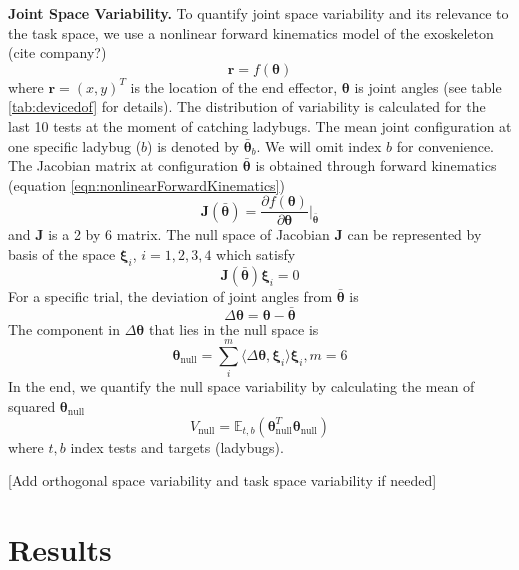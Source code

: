 \textbf{Joint Space Variability.}
To quantify joint space variability and its relevance to the task space, we use a nonlinear forward kinematics model of the exoskeleton (cite company?)
	\begin{equation}\label{eqn:nonlinearForwardKinematics}
	\bm{r} = f(\bm{\theta})
	\end{equation}
where $ \bm{r} = (x,y)^T $ is the location of the end effector, $ \bm{\theta} $ is joint angles (see table \ref{tab:devicedof} for details). 
The distribution of variability is calculated for the last 10 tests at the moment of catching ladybugs. 
The mean joint configuration at one specific ladybug ($ b $) is denoted by $ \bar{\bm{\theta}}_b $.
We will omit index $ b $ for convenience.
The Jacobian matrix at configuration $ \bar{\bm{\theta}} $ is obtained through forward kinematics (equation \ref{eqn:nonlinearForwardKinematics})
	\begin{equation}
	\bm{J}(\bar{\bm{\theta}}) = \frac{\partial f(\bm{\theta})}{\partial \bm{\theta}} \Big\rvert_{\bar{\bm{\theta}}}
	\end{equation}
and $ \bm{J} $ is a 2 by 6 matrix.
The null space of Jacobian $ \bm{J} $ can be represented by basis of the space $ \bm{\xi}_i $, $ i= 1,2,3,4 $ which satisfy
	\begin{equation}
	\bm{J}(\bar{\bm{\theta}}) \bm{\xi}_i = 0
	\end{equation}
For a specific trial, the deviation of joint angles from $ \bar{\bm{\theta}} $ is
	\begin{equation}
	\Delta\bm{\theta} = \bm{\theta} - \bar{\bm{\theta}}
	\end{equation}
The component in $ \Delta\bm{\theta} $ that lies in the null space is
	\begin{equation}
	\bm{\theta}_{\text{null}} = \sum_i^m \langle \Delta\bm{\theta}, \bm{\xi}_i \rangle \bm{\xi}_i, m=6
	\end{equation}
In the end, we quantify the null space variability by calculating the mean of squared $ \bm{\theta}_{\text{null}} $
	\begin{equation}
	V_{\text{null}} = \mathbb{E}_{t,b} (\bm{\theta}_{\text{null}}^T\bm{\theta}_{\text{null}})
	\end{equation}
where $ t,b $ index tests and targets (ladybugs).

[Add orthogonal space variability and task space variability if needed]


\section{Results}

